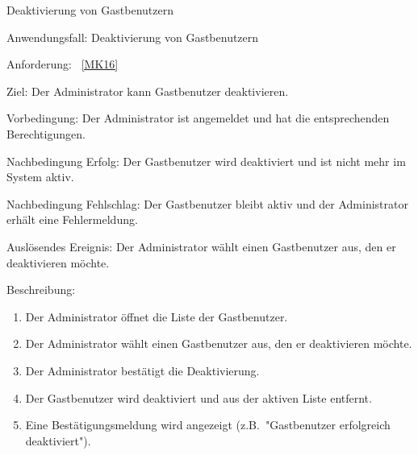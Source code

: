 \begin{function}{50}{Deaktivierung von Gastbenutzern}
    \item[Anwendungsfall:] Deaktivierung von Gastbenutzern
    \item[Anforderung:] ~\ref{MK16}
    \item[Ziel:] Der Administrator kann Gastbenutzer deaktivieren.
    \item[Vorbedingung:] Der Administrator ist angemeldet und hat die entsprechenden Berechtigungen.
    \item[Nachbedingung Erfolg:] Der Gastbenutzer wird deaktiviert und ist nicht mehr im System aktiv.
    \item[Nachbedingung Fehlschlag:] Der Gastbenutzer bleibt aktiv und der Administrator erhält eine Fehlermeldung.
    \item[Auslösendes Ereignis:] Der Administrator wählt einen Gastbenutzer aus, den er deaktivieren möchte.
    \item[Beschreibung:] ~
    \begin{enumerate}
        \item Der Administrator öffnet die Liste der Gastbenutzer.
        \item Der Administrator wählt einen Gastbenutzer aus, den er deaktivieren möchte.
        \item Der Administrator bestätigt die Deaktivierung.
        \item Der Gastbenutzer wird deaktiviert und aus der aktiven Liste entfernt.
        \item Eine Bestätigungsmeldung wird angezeigt (z.B.\ "Gastbenutzer erfolgreich deaktiviert").
    \end{enumerate}
\end{function}

\pagebreak

